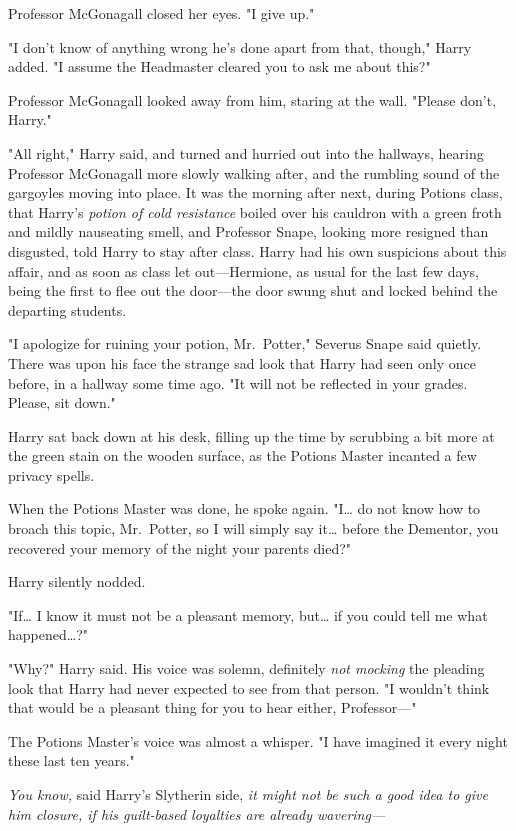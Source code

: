 Professor McGonagall closed her eyes. "I give up."

"I don't know of anything wrong he's done apart from that, though," Harry
added. "I assume the Headmaster cleared you to ask me about this?"

Professor McGonagall looked away from him, staring at the wall. "Please don't,
Harry."

"All right," Harry said, and turned and hurried out into the hallways, hearing
Professor McGonagall more slowly walking after, and the rumbling sound of the
gargoyles moving into place.
\later
It was the morning after next, during Potions class, that Harry's \emph{potion
of cold resistance} boiled over his cauldron with a green froth and mildly
nauseating smell, and Professor Snape, looking more resigned than disgusted,
told Harry to stay after class. Harry had his own suspicions about this affair,
and as soon as class let out---Hermione, as usual for the last few days, being
the first to flee out the door---the door swung shut and locked behind the
departing students.

"I apologize for ruining your potion, Mr.~Potter," Severus Snape said quietly.
There was upon his face the strange sad look that Harry had seen only once
before, in a hallway some time ago. "It will not be reflected in your grades.
Please, sit down."

Harry sat back down at his desk, filling up the time by scrubbing a bit more at
the green stain on the wooden surface, as the Potions Master incanted a few
privacy spells.

When the Potions Master was done, he spoke again. "I{\ldots} do not know how to
broach this topic, Mr.~Potter, so I will simply say it{\ldots} before the
Dementor, you recovered your memory of the night your parents died?"

Harry silently nodded.

"If{\ldots} I know it must not be a pleasant memory, but{\ldots} if you could
tell me what happened{\ldots}?"

"Why?" Harry said. His voice was solemn, definitely \emph{not mocking} the
pleading look that Harry had never expected to see from that person. "I
wouldn't think that would be a pleasant thing for you to hear either,
Professor---"

The Potions Master's voice was almost a whisper. "I have imagined it every
night these last ten years."

\emph{You know,} said Harry's Slytherin side, \emph{it might not be such a good
idea to give him closure, if his guilt-based loyalties are already wavering---}

